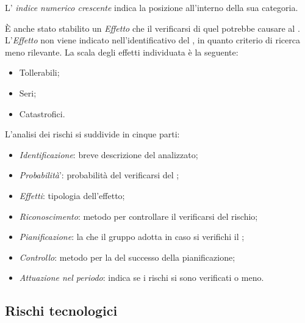 L' \textit{indice numerico crescente} indica la posizione all'interno della sua categoria. 

\`E anche stato stabilito un \textit{Effetto} che il verificarsi di quel  potrebbe causare al . L'\textit{Effetto} non viene indicato nell'identificativo del , in quanto criterio di ricerca meno rilevante. La scala degli effetti individuata è la seguente:
\begin{itemize}
\item Tollerabili;
\item Seri;
\item Catastrofici.
\end{itemize}

L'analisi dei rischi si suddivide in cinque parti:
\begin{itemize}
\item \textit{Identificazione}: breve descrizione del  analizzato;
\item \textit{Probabilit\`a}': probabilit\`a del verificarsi del ;
\item \textit{Effetti}: tipologia dell'effetto;
\item \textit{Riconoscimento}: metodo per controllare il verificarsi del rischio;
\item \textit{Pianificazione}: la  che il gruppo adotta in caso si verifichi il ;
\item \textit{Controllo}: metodo per la  del successo della pianificazione;
\item \textit{Attuazione nel periodo}: indica se i rischi si sono verificati o meno.
\end{itemize}

\subsection{Rischi tecnologici}
